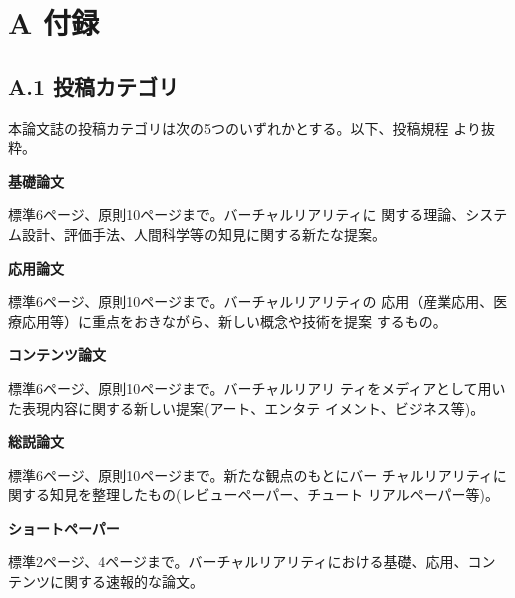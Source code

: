 \documentclass[a4paper,twoside]{jarticle}
\begin{document}
\section*{A 付録}
\subsection*{A.1 投稿カテゴリ}
本論文誌の投稿カテゴリは次の5つのいずれかとする。以下、投稿規程
\cite{toukou}より抜粋。

\noindent
{\bf 基礎論文}

標準6ページ、原則10ページまで。バーチャルリアリティに
関する理論、システム設計、評価手法、人間科学等の知見に関する新たな提案。 

\noindent
{\bf 応用論文}

標準6ページ、原則10ページまで。バーチャルリアリティの
応用（産業応用、医療応用等）に重点をおきながら、新しい概念や技術を提案
するもの。

\noindent
{\bf コンテンツ論文}

標準6ページ、原則10ページまで。バーチャルリアリ
ティをメディアとして用いた表現内容に関する新しい提案(アート、エンタテ
イメント、ビジネス等)。

\noindent
{\bf 総説論文}

標準6ページ、原則10ページまで。新たな観点のもとにバー
チャルリアリティに関する知見を整理したもの(レビューペーパー、チュート
リアルペーパー等)。

\noindent
{\bf ショートペーパー}

標準2ページ、4ページまで。バーチャルリアリティにおける基礎、応用、コン
テンツに関する速報的な論文。


\begin{biography}

\end{biography}
\end{document}
